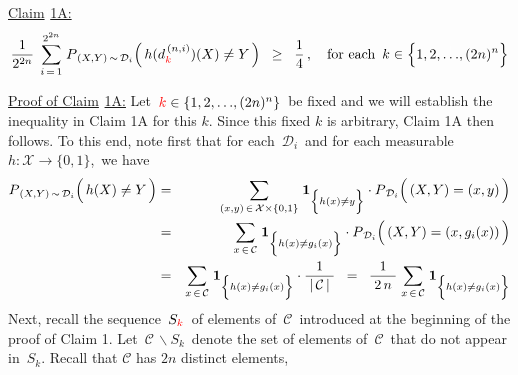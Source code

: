 \vskip 0.5cm
\begin{center}
\begin{minipage}{6.5in}
\noindent
\underline{Claim${\color{white}\textnormal{j}}$1A:}
\begin{equation*}
\dfrac{1}{2^{2n}}\;\,
\overset{2^{2n}}{\underset{i\,=\,1}{\sum}}\;
P_{\,(X,Y)\,\sim\,\mathcal{D}_{i}}\!\left(\,h(d^{\,(n,i)}_{{\color{red}k}})(X) \overset{{\color{white}.}}{\neq} Y\,\right)
\;\; \geq \;\;
	\dfrac{1}{4}\,,
\quad
\textnormal{for each \,$k \in \left\{1,2,\overset{{\color{white}\vert}}{\ldots},(2n)^{n}\right\}$}
\end{equation*}
\end{minipage}
\end{center}
\vskip 0.1cm
\underline{Proof of Claim${\color{white}\textnormal{j}}$1A:}
\vskip 0.2cm
\noindent
Let \,${\color{red}k} \in \{1,2,\overset{{\color{white}\vert}}{\ldots},(2n)^{n}\}$\, be fixed and we will establish
the inequality in Claim 1A for this $k$. Since this fixed $k$ is arbitrary, Claim 1A then follows.
To this end, note first that for each \,$\mathcal{D}_{i}$\, and
for each measurable \,$h : \mathcal{X} \longrightarrow \{0,1\}$,\, we have
\begin{eqnarray*}
P_{\,(X,Y)\,\sim\,\mathcal{D}_{i}}\!\left(\,h(X) \overset{{\color{white}.}}{\neq} Y\,\right)
& = &
	\underset{(x,y)\,\in\,\mathcal{X}\times\{0,1\}}{\sum}\;
	\mathbf{1}_{\left\{h(x) \overset{{\color{white}.}}{\neq} y\right\}}
	\cdot P_{\,\mathcal{D}_{i}}\!\left(\,(X,Y)\overset{{\color{white}-}}{=}(x,y)\,\right)
\\
&= &
	\underset{x\,\in\,\mathcal{C}}{\sum}\;
	\mathbf{1}_{\left\{h(x) \overset{{\color{white}.}}{\neq} g_{i}(x)\right\}}
	\cdot P_{\,\mathcal{D}_{i}}\!\left(\,(X,Y)\overset{{\color{white}-}}{=}(x,g_{i}(x))\,\right)
\\
&= &
	\underset{x\,\in\,\mathcal{C}}{\sum}\;
	\mathbf{1}_{\left\{h(x) \overset{{\color{white}.}}{\neq} g_{i}(x)\right\}}
	\cdot \dfrac{1}{{\color{white}.}\vert\,\mathcal{C}\,\vert{\color{white}.}}
	\;\; = \;\;
	\dfrac{1}{{\color{white}.}2\,n{\color{white}.}}\;
	\underset{x\,\in\,\mathcal{C}}{\sum}\;
	\mathbf{1}_{\left\{h(x) \overset{{\color{white}.}}{\neq} g_{i}(x)\right\}}
\end{eqnarray*}
Next, recall the sequence \,$S_{{\color{red}k}}$\, of elements of \,$\mathcal{C}$\, introduced
at the beginning of the proof of Claim 1.
Let \,$\mathcal{C}\,\backslash S_{k}$\, denote the set of elements of \,$\mathcal{C}$\,
that do not appear in \,$S_{k}$. Recall that $\mathcal{C}$ has $2n$ distinct elements,
